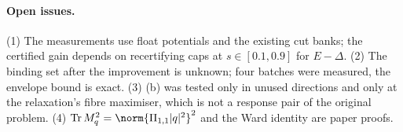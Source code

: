 \paragraph{Open issues.} (1) The measurements use float potentials and the existing cut banks; the certified gain depends on recertifying caps at $s\in[0.1,0.9]$ for $E-\Delta$.
(2) The binding set after the improvement is unknown; four batches were measured, the envelope bound is exact. (3) (b) was tested only in unused directions and only at the
relaxation's fibre maximiser, which is not a response pair of the original problem. (4) $\operatorname{Tr}M_q^2=\norm{\Pi_{1,1}|q|^2}^2$ and the Ward identity are paper proofs.
